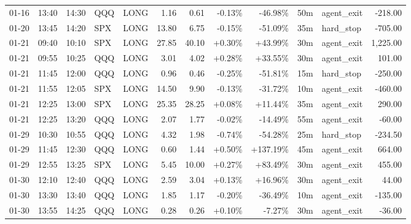 \documentclass[11pt,a4paper,twoside]{article}
\begin{document}
\begin{center}
\begin{longtable}{>{\color{txtmain}}l l l l l r r r r r >{\color{txtmain}}l r}
01-16 & 13:40 & 14:30 & QQQ & LONG & 1.16 & 0.61 & \textcolor{lossred}{-0.13\%} & \textcolor{lossred}{-46.98\%} & 50m & agent\_exit & \textcolor{lossred}{-218.00} \\
01-20 & 13:45 & 14:20 & SPX & LONG & 13.80 & 6.75 & \textcolor{lossred}{-0.15\%} & \textcolor{lossred}{-51.09\%} & 35m & hard\_stop & \textcolor{lossred}{-705.00} \\
01-21 & 09:40 & 10:10 & SPX & LONG & 27.85 & 40.10 & \textcolor{wingreen}{+0.30\%} & \textcolor{wingreen}{+43.99\%} & 30m & agent\_exit & \textcolor{wingreen}{1,225.00} \\
01-21 & 09:55 & 10:25 & QQQ & LONG & 3.01 & 4.02 & \textcolor{wingreen}{+0.28\%} & \textcolor{wingreen}{+33.55\%} & 30m & agent\_exit & \textcolor{wingreen}{101.00} \\
01-21 & 11:45 & 12:00 & QQQ & LONG & 0.96 & 0.46 & \textcolor{lossred}{-0.25\%} & \textcolor{lossred}{-51.81\%} & 15m & hard\_stop & \textcolor{lossred}{-250.00} \\
01-21 & 11:55 & 12:05 & SPX & LONG & 14.50 & 9.90 & \textcolor{lossred}{-0.13\%} & \textcolor{lossred}{-31.72\%} & 10m & agent\_exit & \textcolor{lossred}{-460.00} \\
01-21 & 12:25 & 13:00 & SPX & LONG & 25.35 & 28.25 & \textcolor{wingreen}{+0.08\%} & \textcolor{wingreen}{+11.44\%} & 35m & agent\_exit & \textcolor{wingreen}{290.00} \\
01-21 & 12:25 & 13:20 & QQQ & LONG & 2.07 & 1.77 & \textcolor{lossred}{-0.02\%} & \textcolor{lossred}{-14.49\%} & 55m & agent\_exit & \textcolor{lossred}{-60.00} \\
01-29 & 10:30 & 10:55 & QQQ & LONG & 4.32 & 1.98 & \textcolor{lossred}{-0.74\%} & \textcolor{lossred}{-54.28\%} & 25m & hard\_stop & \textcolor{lossred}{-234.50} \\
01-29 & 11:45 & 12:30 & QQQ & LONG & 0.60 & 1.44 & \textcolor{wingreen}{+0.50\%} & \textcolor{wingreen}{+137.19\%} & 45m & agent\_exit & \textcolor{wingreen}{664.00} \\
01-29 & 12:55 & 13:25 & SPX & LONG & 5.45 & 10.00 & \textcolor{wingreen}{+0.27\%} & \textcolor{wingreen}{+83.49\%} & 30m & agent\_exit & \textcolor{wingreen}{455.00} \\
01-30 & 12:10 & 12:40 & QQQ & LONG & 2.59 & 3.04 & \textcolor{wingreen}{+0.13\%} & \textcolor{wingreen}{+16.96\%} & 30m & agent\_exit & \textcolor{wingreen}{44.00} \\
01-30 & 13:30 & 13:40 & QQQ & LONG & 1.85 & 1.17 & \textcolor{lossred}{-0.20\%} & \textcolor{lossred}{-36.49\%} & 10m & agent\_exit & \textcolor{lossred}{-135.00} \\
01-30 & 13:55 & 14:25 & QQQ & LONG & 0.28 & 0.26 & \textcolor{wingreen}{+0.10\%} & \textcolor{lossred}{-7.27\%} & 30m & agent\_exit & \textcolor{lossred}{-36.00} \\
\end{longtable}
\end{center}
\clearpage
\end{document}
